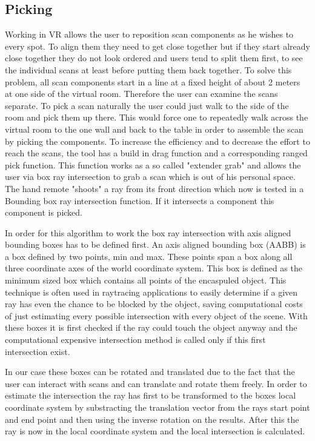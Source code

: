 \documentclass[hyperref,english,bachelorofscience,bibnum]{cgvpub}
\begin{document}
\subsection{Picking}

Working in VR allows the user to reposition scan components as he wishes to every spot. To align them they need to get close together but if they start already close together they do not look ordered and users tend to split them first, to see the individual scans at least before putting them back together. To solve this problem, all scan components start in a line at a fixed height of about 2 meters at one side of the virtual room. Therefore the user can examine the scans separate.
To pick a scan naturally the user could just walk to the side of the room and pick them up there. This would force one to repeatedly walk across the virtual room to the one wall and back to the table in order to assemble the scan by picking the components. To increase the efficiency and to decrease the effort to reach the scans, the tool has a build in drag function and a corresponding ranged pick function. This function works as a so called "extender grab"\cite{Jerald2015} %
and allows the user via box ray intersection to grab a scan which is out of his personal space.
The hand remote "shoots" a ray from its front direction which now is tested in a Bounding box ray intersection function. If it intersects a component this component is picked.


In order for this algorithm to work the box ray intersection with axis aligned bounding boxes has to be defined first.
An axis aligned bounding box (AABB) is a box defined by two points, min and max. These points span a box along all three coordinate axes of the world coordinate system. This box is defined as the minimum sized box which contains all points of the encaspuled object. This technique is often used in raytracing applications to easily determine if a given ray has even the chance to be blocked by the object, saving computational costs of just estimating every possible intersection with every object of the scene. With these boxes it is first checked if the ray could touch the object anyway and the computational expensive intersection method is called only if this first intersection exist.

In our case these boxes can be rotated and translated due to the fact that the user can interact with scans and can translate and rotate them freely. In order to estimate the intersection the ray has first to be transformed to the boxes local coordinate system by substracting the translation vector from the rays start point and end point and then using the inverse rotation on the results.
After this the ray is now in the local coordinate system and the local intersection is calculated.
\end{document}
